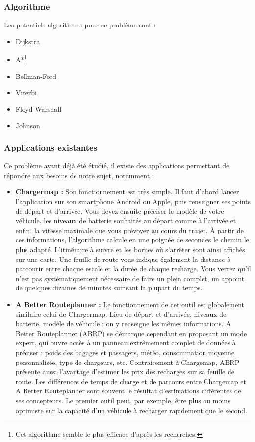\documentclass[a4paper, 12pt]{report}
\begin{document}
\subsubsection{Algorithme}
Les potentiels algorithmes pour ce problème sont :
\begin{itemize}
    \item Dijkstra
    \item A*\footnote{Cet algorithme semble le plus efficace d’après les recherches.}
    \item Bellman-Ford
    \item Viterbi
    \item Floyd-Warshall\footnotemark[3]
    \item Johnson\footnotemark[3]
\end{itemize}


\subsubsection{Applications existantes}
Ce problème ayant déjà été étudié, il existe des applications permettant de répondre aux besoins de notre sujet, notamment :

\begin{itemize}
    \item \textbf{\underline{Chargermap} :} Son fonctionnement est très simple. Il faut d’abord lancer l’application sur son smartphone Android ou Apple, puis renseigner ses points de départ et d’arrivée. Vous devez ensuite préciser le modèle de votre véhicule, les niveaux de batterie souhaités au départ comme à l’arrivée et enfin, la vitesse maximale que vous prévoyez au cours du trajet. À partir de ces informations, l’algorithme calcule en une poignée de secondes le chemin le plus adapté. L’itinéraire à suivre et les bornes où s’arrêter sont ainsi affichés sur une carte. Une feuille de route vous indique également la distance à parcourir entre chaque escale et la durée de chaque recharge. Vous verrez qu’il n’est pas systématiquement nécessaire de faire un plein complet, un appoint de quelques dizaines de minutes suffisant la plupart du temps.
          \bigskip
    \item \textbf{\underline{A Better Routeplanner} :} Le fonctionnement de cet outil est globalement similaire celui de Chargermap. Lieu de départ et d’arrivée, niveaux de batterie, modèle de véhicule : on y renseigne les mêmes informations. A Better Routeplanner (ABRP) se démarque cependant en proposant un mode expert, qui ouvre accès à un panneau extrêmement complet de données à préciser : poids des bagages et passagers, météo, consommation moyenne personnalisée, type de chargeurs, etc. Contrairement à Chargemap, ABRP présente aussi l’avantage d’estimer les prix des recharges sur sa feuille de route. Les différences de temps de charge et de parcours entre Chargemap et A Better Routeplanner sont souvent le résultat d’estimations différentes de ses concepteurs. Le premier outil peut, par exemple, être plus ou moins optimiste sur la capacité d’un véhicule à recharger rapidement que le second.
\end{itemize}
\end{document}
